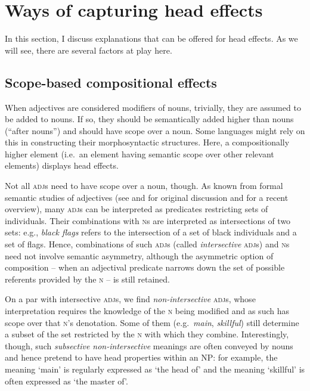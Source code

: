 \documentclass[output=paper,nobabel,draftmode  ,colorlinks, citecolor=brown]{langscibook}
\begin{document}
\section{Ways of capturing head effects}\label{sec-headeffects}

In this section, I discuss explanations that can be offered for head effects. As we will see, there are several factors at play here.

\subsection{Scope-based compositional effects}\label{subsec-scopebased}

When adjectives are considered modifiers of nouns, trivially, they are assumed to be added to
nouns. If so, they should be semantically added higher than nouns (``after nouns'') and should have
scope over a noun. Some languages might rely on this in constructing their morphosyntactic
structures. Here, a compositionally higher element (i.e.\ an element having semantic scope over other
relevant elements) displays head effects.

Not all \textsc{adj}s need to have scope over a noun, though. As known from formal semantic studies
of adjectives (see \citet{Kamp1975} and \citet{Siegel1976} for original discussion and
\citet{McNally2016} for a recent overview), many \textsc{adj}s can be interpreted as predicates
restricting sets of individuals. Their combinations with \textsc{n}s are interpreted as
intersections of two sets: e.g., \emph{black flags} refers to the intersection of a set of black
individuals and a set of flags. Hence, combinations of such \textsc{adj}s (called \emph{intersective}
\textsc{adj}s) and \textsc{n}s need not involve semantic asymmetry, although the asymmetric option of
composition – when an adjectival predicate narrows down the set of possible referents provided by
the \textsc{n} – is still retained. 

On a par with intersective \textsc{adj}s, we find \emph{non-intersective} \textsc{adj}s, whose
interpretation requires the knowledge of the \textsc{n} being modified and as such has scope over
that \textsc{n}'s denotation. Some of them (e.g.\ \emph{main}, \emph{skillful}) still determine a subset of
the set restricted by the \textsc{n} with which they combine. Interestingly, though, such \emph{subsective
non-intersective} meanings are often conveyed by nouns and hence pretend to have head properties
within an NP: for example, the meaning `main' is regularly expressed as `the head of' and the
meaning `skillful' is often expressed as `the master of'. 
\end{document}
